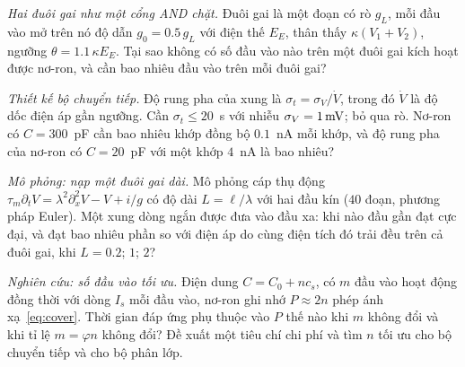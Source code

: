 \begin{exercise}[\lvlB]
\label{ex:19:4}
\emph{Hai đuôi gai như một cổng AND chặt.} Đuôi gai là một đoạn có rò $g_L$, mỗi đầu vào mở trên nó độ dẫn $g_0=0.5\,g_L$ với điện thế $E_E$, thân thấy $\kappa(V_1+V_2)$, ngưỡng $\theta=1.1\,\kappa E_E$. Tại sao không có số đầu vào nào trên một đuôi gai kích hoạt được nơ-ron, và cần bao nhiêu đầu vào trên mỗi đuôi gai?
\end{exercise}

\begin{exercise}[\lvlB]
\label{ex:19:5}
\emph{Thiết kế bộ chuyển tiếp.} Độ rung pha của xung là $\sigma_t=\sigma_V/\dot V$, trong đó $\dot V$ là độ dốc điện áp gần ngưỡng. Cần $\sigma_t\le20$~\textmu s với nhiễu $\sigma_V=1\,\text{mV}$; bỏ qua rò. Nơ-ron có $C=300$~pF cần bao nhiêu khớp đồng bộ $0.1$~nA mỗi khớp, và độ rung pha của nơ-ron có $C=20$~pF với một khớp $4$~nA là bao nhiêu?
\end{exercise}

\begin{exercise}[\lvlB]
\label{ex:19:6}
\emph{Mô phỏng: nạp một đuôi gai dài.} Mô phỏng cáp thụ động $\tau_m\partial_tV=\lambda^2\partial_x^2V-V+i/g$ có độ dài $L=\ell/\lambda$ với hai đầu kín ($40$ đoạn, phương pháp Euler). Một xung dòng ngắn được đưa vào đầu xa: khi nào đầu gần đạt cực đại, và đạt bao nhiêu phần so với điện áp do cùng điện tích đó trải đều trên cả đuôi gai, khi $L=0.2$; $1$; $2$?
\end{exercise}

\begin{exercise}[\lvlC]
\label{ex:19:7}
\emph{Nghiên cứu: số đầu vào tối ưu.} Điện dung $C=C_0+nc_s$, có $m$ đầu vào hoạt động đồng thời với dòng $I_s$ mỗi đầu vào, nơ-ron ghi nhớ $P\approx2n$ phép ánh xạ~\eqref{eq:cover}. Thời gian đáp ứng phụ thuộc vào $P$ thế nào khi $m$ không đổi và khi tỉ lệ $m=\varphi n$ không đổi? Đề xuất một tiêu chí chi phí và tìm $n$ tối ưu cho bộ chuyển tiếp và cho bộ phân lớp.
\end{exercise}
